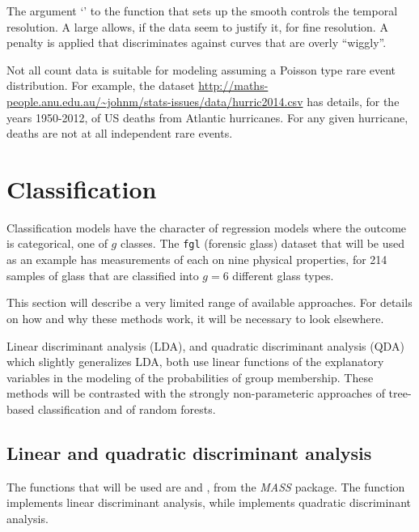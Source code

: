 The argument `' to the function  that sets up the
smooth controls the temporal resolution.  A large  allows,
if the data seem to justify it, for fine resolution. A penalty is
applied that discriminates against curves that are overly ``wiggly''.

Not all count data is suitable for modeling assuming a Poisson type
rare event distribution. For example, the dataset
\url{http://maths-people.anu.edu.au/~johnm/stats-issues/data/hurric2014.csv}
has details, for the years 1950-2012, of US deaths from Atlantic
hurricanes.  For any given hurricane, deaths are not at all independent
rare events.

\section{Classification}

Classification models 
have the character of regression models where
the outcome is categorical, one of $g$ classes.  The
\texttt{fgl} (forensic glass) dataset that will be used as an example
has measurements of each on nine physical properties, for 214 samples
of glass that are classified into $g=6$ different glass types.  

This section will describe a very limited range of available
approaches.  For details
on how and why these methods work, it will be necessary to look
elsewhere.

Linear discriminant analysis (LDA), and quadratic
discriminant analysis (QDA) which slightly generalizes LDA,
both use linear functions of the explanatory variables in the
modeling of the probabilities of group membership.  These
methods will be contrasted with the strongly non-parameteric
approaches of tree-based classification and of random forests.

\subsection*{Linear and quadratic discriminant analysis}

The functions that will be used are 
and , from the \textit{MASS} package.  The function
 implements linear discriminant analysis, while
 implements quadratic discriminant analysis.

